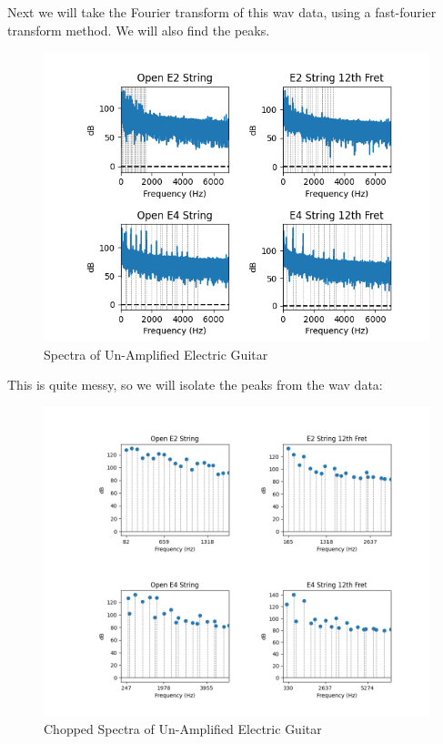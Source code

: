\documentclass[10pt, a4paper]{article}
\begin{document}
Next we will take the Fourier transform of this wav data, using a fast-fourier transform method. We will also find the peaks. 

\begin{figure}[H]
\centering
\caption{Spectra of Un-Amplified Electric Guitar}
\includegraphics[scale=0.8]{fft_peaks.png}
\end{figure}

This is quite messy, so we will isolate the peaks from the wav data:

\begin{figure}[H]
\centering
\caption{Chopped Spectra of Un-Amplified Electric Guitar}
\includegraphics[scale=0.5]{ipeaks.png}
\end{figure}
\end{document}
